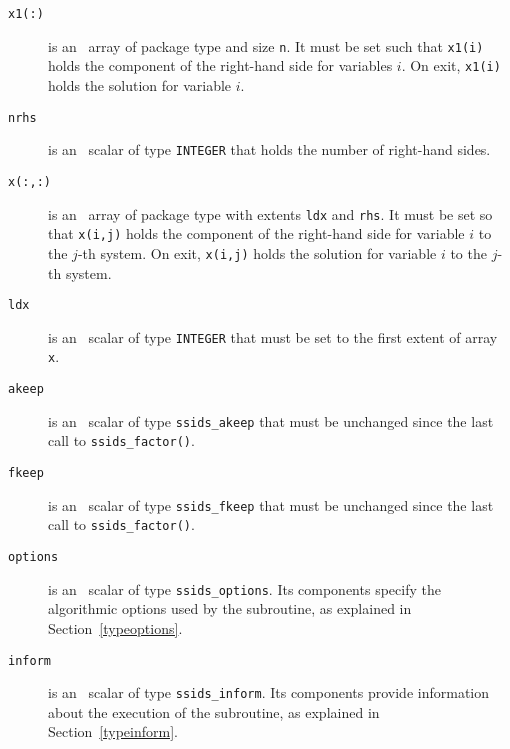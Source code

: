 \documentclass{spral}
\begin{document}
\begin{description}
\item[\texttt{x1(:)}] is an \intentinout\ array of package type and size
\texttt{n}. It must be set such that \texttt{x1(i)} holds the component of
the right-hand side for variables $i$. On exit, \texttt{x1(i)} holds the
solution for variable $i$.

\item[\texttt{nrhs}] is an \intentin\ scalar of type {\tt INTEGER} that holds
the number of right-hand sides.

\item[\texttt{x(:,:)}] is an \intentinout\ array of package type with extents
\texttt{ldx} and \texttt{rhs}. It must be set so that \texttt{x(i,j)} holds the
component of the right-hand side for variable $i$ to the $j$-th
system. On exit, \texttt{x(i,j)} holds the solution for variable $i$ to
the $j$-th system.

\item[\texttt{ldx}] is an \intentin\ scalar of type {\tt INTEGER} that must be
set to the first extent of array \texttt{x}.

\item[\texttt{akeep}]  is an \intentin\ scalar of type {\tt ssids\_akeep} that
must be unchanged since the last call to {\tt ssids\_factor()}.

\item[\texttt{fkeep}]  is an \intentin\ scalar of type {\tt ssids\_fkeep} that
must be unchanged since the last call to {\tt ssids\_factor()}.

\item[\texttt{options}] is an \intentin\ scalar of type {\tt ssids\_options}.
Its components specify the algorithmic options used by the subroutine, as
explained in Section~\ref{typeoptions}.

\item[\texttt{inform}] is an \intentout\ scalar of type
{\tt ssids\_inform}. Its components provide information about the execution
of the subroutine, as explained in Section~\ref{typeinform}.


\end{description}
\end{document}
